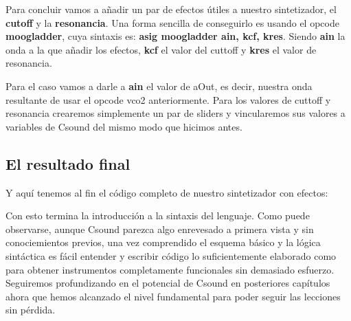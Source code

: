 Para concluir vamos a añadir un par de efectos útiles a nuestro sintetizador, el \textbf{cutoff} y la \textbf{resonancia}. Una forma sencilla de conseguirlo es usando el opcode \textbf{moogladder}, cuya sintaxis es: \textbf{asig moogladder ain, kcf, kres}. Siendo \textbf{ain} la onda a la que añadir los efectos, \textbf{kcf} el valor del cuttoff y \textbf{kres} el valor de resonancia.

Para el caso vamos a darle a \textbf{ain} el valor de aOut, es decir, nuestra onda resultante de usar el opcode vco2 anteriormente. Para los valores de cuttoff y resonancia crearemos simplemente un par de sliders y vincularemos sus valores a variables de Csound del mismo modo que hicimos antes.
\pagebreak 
\subsection{El resultado final}\label{sec:SinteCompleto}

Y aquí tenemos al fin el código completo de nuestro sintetizador con efectos:


Con esto termina la introducción a la sintaxis del lenguaje. Como puede observarse, aunque Csound parezca algo enrevesado a primera vista y sin conociemientos previos, una vez comprendido el esquema básico y la lógica sintáctica es fácil entender y escribir código lo suficientemente elaborado como para obtener instrumentos completamente funcionales sin demasiado esfuerzo.
Seguiremos profundizando en el potencial de Csound en posteriores capítulos ahora que hemos alcanzado el nivel fundamental para poder seguir las lecciones sin pérdida.
